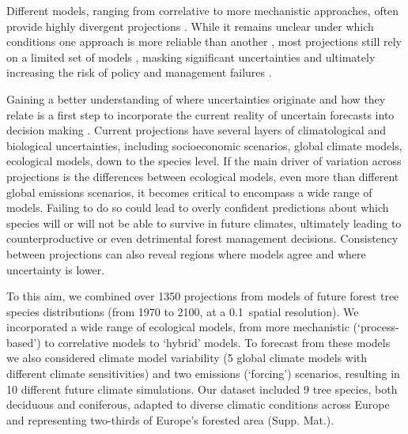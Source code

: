 \documentclass[11pt,letter]{article}
\begin{document}
Different models, ranging from correlative to more mechanistic approaches, often provide highly divergent projections \citep{Morin2009, Keenan2011a, Cheaib2012, Takolander2019}. While it remains unclear under which conditions one approach is more reliable than another \citep{VanderMeersch2024}, most projections still rely on a limited set of models \citep{Dyderski2018, Wessely2024, Hanewinkel2013, Schueler2014}, masking significant uncertainties and ultimately increasing the risk of policy and management failures \citep{Dawson2011}. 

Gaining a better understanding of where uncertainties originate and how they relate is a first step to incorporate the current reality of uncertain forecasts into decision making \citep{Urban2016, Saltelli2020, Johnson2024, Simmonds2024}. %
Current projections have several layers of climatological and biological uncertainties, including socioeconomic scenarios, global climate models, ecological models, down to the species level. If the main driver of variation across projections is the differences between ecological models, even more than different global emissions scenarios, it becomes critical to encompass a wide range of models. Failing to do so could lead to overly confident predictions about which species will or will not be able to survive in future climates, ultimately leading to counterproductive or even detrimental forest management decisions.
Consistency between projections can also reveal regions where models agree and where uncertainty is lower.

To this aim, we combined over 1350 projections from models of future forest tree species distributions (from 1970 to 2100, at a 0.1\degree~spatial resolution). We incorporated a wide range of ecological models, from more mechanistic (‘process-based’) to correlative models to `hybrid' models. To forecast from these models we also considered climate model variability (5 global climate models with different climate sensitivities) and two emissions (`forcing') scenarios, resulting in 10 different future climate simulations. Our dataset included 9 tree species, both deciduous and coniferous, adapted to diverse climatic conditions across Europe and representing two-thirds of Europe's forested area (Supp. Mat.).
\end{document}
